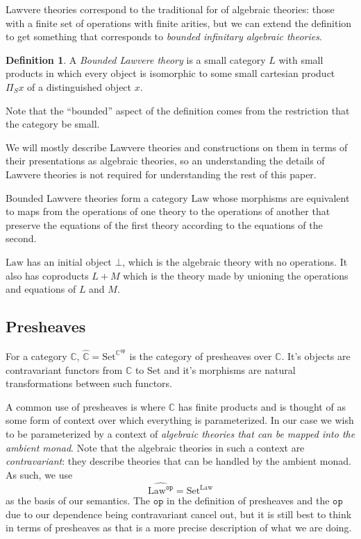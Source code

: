 \documentclass[acmsmall, screen, nonacm]{acmart}
\theoremstyle{definition}
\newtheorem{definition}{Definition}[section]
\newcommand{\cat}{\mathbb{C}}
\newcommand{\op}{\mathtt{op}}
\newcommand{\catop}{\cat^{\op}}
\newcommand{\setc}{\mathrm{Set}}
\newcommand{\psh}{\widehat{\cat}}
\newcommand{\initial}{\bot}
\newcommand{\lawc}{\mathrm{Law}}
\newcommand{\lawcop}{\lawc^{\mathtt{op}}}
\newcommand{\pshlawcop}{\widehat{\lawcop}}
\begin{document}
Lawvere theories correspond to the traditional for of algebraic
theories: those with a finite set of operations with finite arities, but
we can extend the definition to get something that corresponds to
\emph{bounded infinitary algebraic theories}.
\begin{definition}
  A \emph{Bounded Lawvere theory} is a small category $L$ with small
  products in which every object is isomorphic to some small cartesian
  product $\Pi_S x$ of a distinguished object $x$.
\end{definition}
Note that the ``bounded'' aspect of the definition comes from the
restriction that the category be small.

We will mostly describe Lawvere theories and constructions on them in
terms of their presentations as algebraic theories, so an understanding
the details of Lawvere theories is not required for understanding the
rest of this paper.

Bounded Lawvere theories form a category $\lawc$ whose morphisms are
equivalent to maps from the operations of one theory to the operations
of another that preserve the equations of the first theory according to
the equations of the second.

$\lawc$ has an initial object $\initial$, which is the algebraic theory
with no operations. It also has coproducts $L + M$ which is the theory
made by unioning the operations and equations of $L$ and $M$.

\subsection{Presheaves}

For a category $\cat$, $\psh = \setc^{\catop}$ is the category of
presheaves over $\cat$. It's objects are contravariant functors from
$\cat$ to $\setc$ and it's morphisms are natural transformations between
such functors.

A common use of presheaves is where $\cat$ has finite products and is
thought of as some form of context over which everything is
parameterized. In our case we wish to be parameterized by a context of
\emph{algebraic theories that can be mapped into the ambient
  monad}. Note that the algebraic theories in such a context are
\emph{contravariant}: they describe theories that can be handled by the
ambient monad. As such, we use
\begin{equation*}
  \pshlawcop = \setc^{\lawc}
\end{equation*}
as the basis of our semantics. The $\op$ in the definition of presheaves
and the $\op$ due to our dependence being contravariant cancel out, but
it is still best to think in terms of presheaves as that is a more
precise description of what we are doing.
\end{document}
